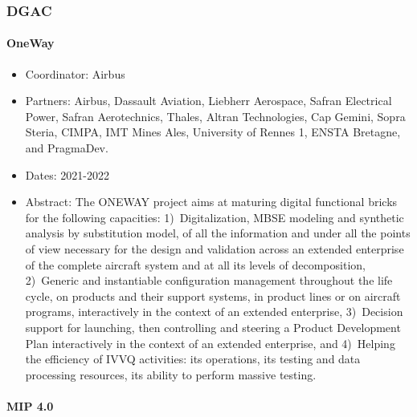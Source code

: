 \subsubsection{DGAC}

\paragraph*{\label{project:oneway}OneWay}
\begin{participants}
\end{participants}

   \begin{itemize}
   	    \item Coordinator: Airbus
      	\item Partners: Airbus, Dassault Aviation, Liebherr Aerospace, Safran Electrical Power, Safran
Aerotechnics, Thales, Altran Technologies, Cap Gemini, Sopra Steria, CIMPA, IMT Mines Ales, University of
Rennes 1, ENSTA Bretagne, and PragmaDev.
      	\item Dates: 2021-2022
      	\item Abstract: The ONEWAY project aims at maturing digital functional bricks for the following capacities: 1)~Digitalization, MBSE modeling and synthetic analysis by substitution model, of all the information and under all the points of view necessary for the design and validation across an extended enterprise of the complete aircraft system and at all its levels of decomposition, 2)~Generic and instantiable configuration management throughout the life cycle, on products and their support systems, in product lines or on aircraft programs, interactively in the context of an extended enterprise, 3)~Decision support for launching, then controlling and steering a Product Development Plan interactively in the context of an extended enterprise, and 4)~Helping the efficiency of IVVQ activities: its operations, its testing and data processing resources, its ability to perform massive testing.
      \end{itemize}
      
\paragraph*{\label{project:mip4}MIP 4.0}
\begin{participants}
\end{participants}

